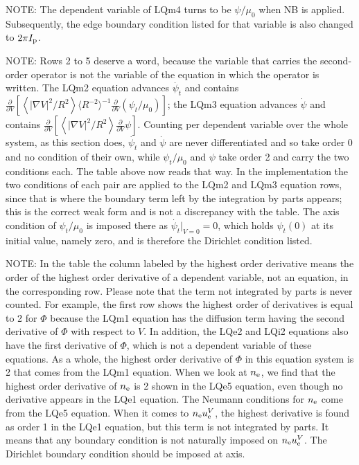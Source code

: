 \documentclass[11pt]{article}
\def\r#1{{\rm#1}}
\def\ave#1{\left\langle#1\right\rangle}
\def\aves#1{\langle#1\rangle}
\def\ddV{\frac{\partial}{\partial V}}
\def\psid{\dot{\psi}}
\def\psit{\psi_t}
\def\psitd{\dot{\psit}}
\def\nee{n_\r{e}}
\def\uV#1{u_\r{#1}^V}
\begin{document}
\medskip

NOTE: The dependent variable of LQm4 turns to be $\psi/\mu_0$ when NB is
applied. Subsequently, the edge boundary condition listed for that variable
is also changed to $2\pi I_\r{p}$.

NOTE: Rows 2 to 5 deserve a word, because the variable that carries the
second-order operator is not the variable of the equation in which the
operator is written. The LQm2 equation advances $\psitd$ and contains
$\ddV[\ave{|\nabla V|^2/R^2}\aves{R^{-2}}^{-1}\ddV(\psit/\mu_0)]$; the
LQm3 equation advances $\psid$ and contains
$\ddV[\ave{|\nabla V|^2/R^2}\ddV\psi]$. Counting per dependent variable
over the whole system, as this section does, $\psitd$ and $\psid$ are never
differentiated and so take order 0 and no condition of their own, while
$\psit/\mu_0$ and $\psi$ take order 2 and carry the two conditions each.
The table above now reads that way.
In the implementation the two conditions of each pair are applied to the
LQm2 and LQm3 equation rows, since that is where the boundary term left by
the integration by parts appears; this is the correct weak form and is not
a discrepancy with the table. The axis condition of $\psit/\mu_0$ is imposed
there as $\psitd|_{V=0}=0$, which holds $\psit(0)$ at its initial value,
namely zero, and is therefore the Dirichlet condition listed.

NOTE: In the table the column labeled by the highest order derivative means
the order of the highest order derivative of a dependent variable, not
an equation, in the corresponding row.
Please note that the term not integrated by parts is never counted.
For example, the first row shows the highest order of derivatives is
equal to 2 for $\Phi$ because the LQm1 equation
has the diffusion term having the second derivative of $\Phi$ with
respect to $V$. In addition, the LQe2 and LQi2 equations also have the
first derivative of $\Phi$, which is not a dependent variable of these
equations. As a whole, the highest order derivative of $\Phi$ in this
equation system is 2 that comes from the LQm1 equation.
When we look at $\nee$, we find that the highest order derivative of
$\nee$ is 2 shown in the LQe5 equation, even though no derivative
appears in the LQe1 equation. The Neumann conditions for $\nee$ come
from the LQe5 equation.
When it comes to $\nee\uV{e}$, the highest derivative is found as order 1
in the LQe1 equation, but this term is not integrated by parts.
It means that any boundary condition is not naturally imposed on
$\nee\uV{e}$. The Dirichlet boundary condition should be imposed at axis.
\end{document}
